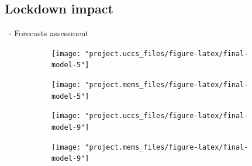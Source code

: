 \documentclass{beamer}
\begin{document}
\subsection{Lockdown impact}

\begin{frame}{\subsecname~- Forecasts assessment}
	\begin{figure}
		\begin{subfigure}{.45\linewidth}
			\texttt{[image: "project.uccs\_files/figure-latex/final-model-5"]}
		\end{subfigure}
		\begin{subfigure}{.45\linewidth}
			\texttt{[image: "project.mems\_files/figure-latex/final-model-5"]}
		\end{subfigure}
	\end{figure}
	\begin{figure}
		\begin{subfigure}{.45\linewidth}
			\texttt{[image: "project.uccs\_files/figure-latex/final-model-9"]}
		\end{subfigure}
		\begin{subfigure}{.45\linewidth}
			\texttt{[image: "project.mems\_files/figure-latex/final-model-9"]}
		\end{subfigure}
	\end{figure}
\end{frame}
\end{document}
